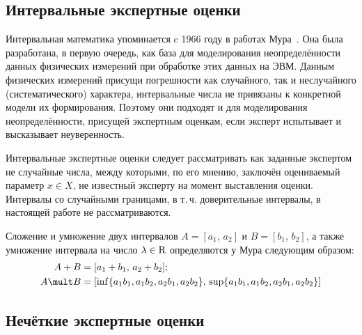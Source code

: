 \subsection{Интервальные экспертные оценки}

Интервальная математика упоминается c 1966 году в работах Мура~\cite{moore1966interval, moore2009introduction}. Она была разработана, в первую очередь, как база для моделирования неопределённости данных физических измерений при обработке этих данных на ЭВМ. Данным физических измерений присущи погрешности как случайного, так и неслучайного (систематического) характера, интервальные числа не привязаны к конкретной модели их формирования. Поэтому они подходят и для моделирования неопределённости, присущей экспертным оценкам, если эксперт испытывает и высказывает неуверенность. 

Интервальные экспертные оценки следует рассматривать как заданные экспертом не случайные числа, между которыми, по его мнению, заключён оцениваемый параметр $x \in X$, не известный эксперту на момент выставления оценки.  Интервалы со случайными границами, в т.\,ч. доверительные интервалы, в настоящей работе не рассматриваются.

Сложение и умножение двух интервалов $A = [a_1,\,a_2]$ и $B = [b_1,\,b_2]$, а также умножение интервала на число $\lambda \in {\mathrm{R}}$ определяются у Мура следующим образом:
\begin{equation*}
\begin{split}
 A + B &= [a_1+b_1,\,a_2+b_2];\\
 A \mult B &= [\inf\{a_1b_1,a_1b_2,a_2b_1,a_2b_2\},\,\sup\{a_1b_1,a_1b_2,a_2b_1,a_2b_2\}]
\end{split} 
\end{equation*}

\subsection{Нечёткие экспертные оценки}


